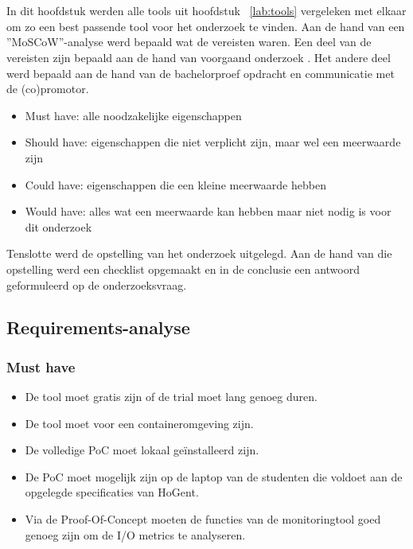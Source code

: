 \chapter{}
\label{ch:methodologie}

In dit hoofdstuk werden alle tools uit hoofdstuk ~\ref{lab:tools} vergeleken met elkaar om zo een best passende tool voor het onderzoek te vinden. Aan de hand van een ''MoSCoW''-analyse werd bepaald wat de vereisten waren. Een deel van de vereisten zijn bepaald aan de hand van voorgaand onderzoek \autocite{Cedric2019}. Het andere deel werd bepaald aan de hand van de bachelorproef opdracht en communicatie met de (co)promotor.
 
\begin{itemize}
    \item Must have: alle noodzakelijke eigenschappen
    \item Should have: eigenschappen die niet verplicht zijn, maar wel een meerwaarde zijn
    \item Could have: eigenschappen die een kleine meerwaarde hebben
    \item Would have: alles wat een meerwaarde kan hebben maar niet nodig is voor dit onderzoek
\end{itemize}

Tenslotte werd de opstelling van het onderzoek uitgelegd. Aan de hand van die opstelling werd een checklist opgemaakt en in de conclusie een antwoord geformuleerd op de onderzoeksvraag.\clearpage

\section{Requirements-analyse}
\subsection{Must have}
\begin{itemize}
    \item De tool moet gratis zijn of de trial moet lang genoeg duren.
    \item De tool moet voor een containeromgeving zijn.
    \item De volledige PoC moet lokaal geïnstalleerd zijn.
    \item De PoC moet mogelijk zijn op de laptop van de studenten die voldoet aan de opgelegde specificaties van HoGent.
    \item Via de Proof-Of-Concept moeten de functies van de monitoringtool goed genoeg zijn om de I/O metrics te analyseren.
\end{itemize}


